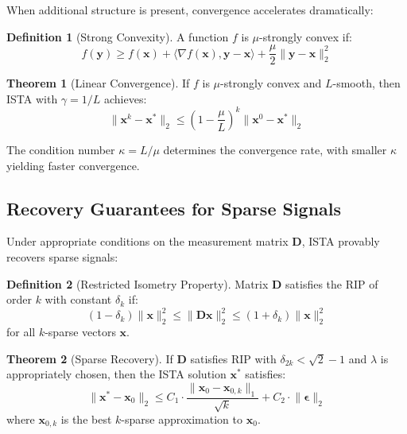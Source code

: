 \documentclass[12pt]{article}
\renewcommand{\vec}[1]{\mathbf{#1}}
\newcommand{\norm}[1]{\lVert #1 \rVert}
\theoremstyle{definition}
\newtheorem{definition}{Definition}[section]
\newtheorem{theorem}{Theorem}[section]
\begin{document}
When additional structure is present, convergence accelerates dramatically:

\begin{definition}[Strong Convexity]
    A function $f$ is $\mu$-strongly convex if:
    \begin{equation}
        f(\vec{y}) \geq f(\vec{x}) + \langle \nabla f(\vec{x}), \vec{y} - \vec{x} \rangle + \frac{\mu}{2}\norm{\vec{y} - \vec{x}}_2^2
    \end{equation}
\end{definition}

\begin{theorem}[Linear Convergence]
    If $f$ is $\mu$-strongly convex and $L$-smooth, then ISTA with $\gamma = 1/L$ achieves:
    \begin{equation}
        \norm{\vec{x}^k - \vec{x}^*}_2 \leq \left(1 - \frac{\mu}{L}\right)^k \norm{\vec{x}^0 - \vec{x}^*}_2
    \end{equation}
\end{theorem}

The condition number $\kappa = L/\mu$ determines the convergence rate, with smaller $\kappa$ yielding faster convergence.

\subsection{Recovery Guarantees for Sparse Signals}

Under appropriate conditions on the measurement matrix $\vec{D}$, ISTA provably recovers sparse signals:

\begin{definition}[Restricted Isometry Property]
    Matrix $\vec{D}$ satisfies the RIP of order $k$ with constant $\delta_k$ if:
    \begin{equation}
        (1-\delta_k)\norm{\vec{x}}_2^2 \leq \norm{\vec{D}\vec{x}}_2^2 \leq (1+\delta_k)\norm{\vec{x}}_2^2
    \end{equation}
    for all $k$-sparse vectors $\vec{x}$.
\end{definition}

\begin{theorem}[Sparse Recovery]
    If $\vec{D}$ satisfies RIP with $\delta_{2k} < \sqrt{2} - 1$ and $\lambda$ is appropriately chosen, then the ISTA solution $\vec{x}^*$ satisfies:
    \begin{equation}
        \norm{\vec{x}^* - \vec{x}_0}_2 \leq C_1 \cdot \frac{\norm{\vec{x}_0 - \vec{x}_{0,k}}_1}{\sqrt{k}} + C_2 \cdot \norm{\vec{\epsilon}}_2
    \end{equation}
    where $\vec{x}_{0,k}$ is the best $k$-sparse approximation to $\vec{x}_0$.
\end{theorem}
\end{document}
